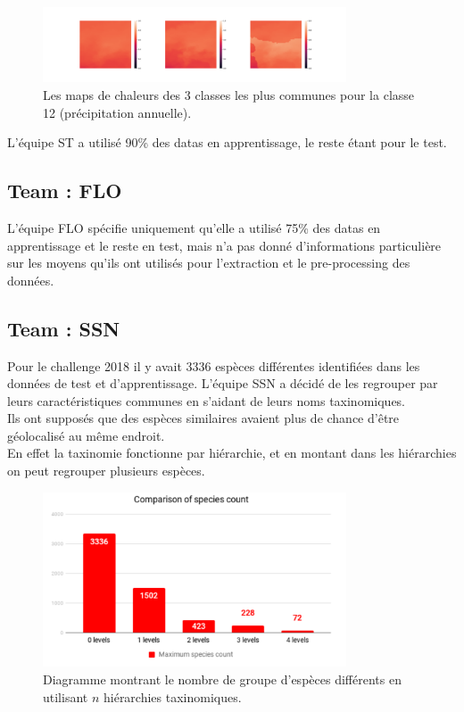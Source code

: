 \documentclass{article}
\begin{document}
\begin{figure}[H]
	\center
	\includegraphics[width=9cm]{figure/figure5.png} 
	 \caption{Les maps de chaleurs des 3 classes les plus communes pour la classe 12 (précipitation annuelle).}
\end{figure}
L'équipe ST a utilisé 90\% des datas en apprentissage, le reste étant pour le test.
\subsection{Team : FLO}
L'équipe FLO spécifie uniquement qu'elle a utilisé 75\% des datas en apprentissage et le reste en test, mais n'a pas donné d'informations particulière sur les moyens qu'ils ont utilisés pour l'extraction et le pre-processing des données.\\


\subsection{Team : SSN}

Pour le challenge 2018 il y avait 3336 espèces différentes identifiées dans les données de test et d'apprentissage. L'équipe SSN a décidé de les regrouper par leurs caractéristiques communes en s'aidant de leurs noms taxinomiques. \\Ils ont supposés que des espèces similaires avaient plus de chance d'être géolocalisé au même endroit.\\ 
En effet la taxinomie fonctionne par hiérarchie, et en montant dans les hiérarchies on peut regrouper plusieurs espèces.\\

\begin{figure}[H]
	\center
	\includegraphics[width=9cm]{figure/figure6.png} 
	 \caption{Diagramme montrant le nombre de groupe d'espèces différents en utilisant $n$ hiérarchies taxinomiques. }
\end{figure}
\end{document}
